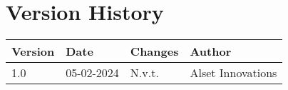 \section*{Version History} 

\begin{table}[h]
\begin{tabular}{|l|l|l|l|}
\hline
\rowcolor[HTML]{4472C4} 
{\color[HTML]{FFFFFF} \textbf{Version}} &
  {\color[HTML]{FFFFFF} \textbf{Date}} &
  {\color[HTML]{FFFFFF} \textbf{Changes}} &
  {\color[HTML]{FFFFFF} \textbf{Author}} \\ \hline
\rowcolor[HTML]{D9E1F2} 
1.0 &
  \multicolumn{1}{c|}{\cellcolor[HTML]{D9E1F2}05-02-2024} &
 N.v.t. &
  Alset Innovations \\ \hline



\end{tabular}
\end{table}